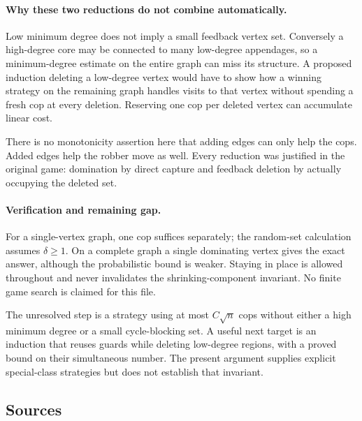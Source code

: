 \documentclass[11pt,a4paper]{article}
\begin{document}
\paragraph{Why these two reductions do not combine automatically.}
Low minimum degree does not imply a small feedback vertex set. Conversely a high-degree core may be connected to many low-degree appendages, so a minimum-degree estimate on the entire graph can miss its structure. A proposed induction deleting a low-degree vertex would have to show how a winning strategy on the remaining graph handles visits to that vertex without spending a fresh cop at every deletion. Reserving one cop per deleted vertex can accumulate linear cost.

There is no monotonicity assertion here that adding edges can only help the cops. Added edges help the robber move as well. Every reduction was justified in the original game: domination by direct capture and feedback deletion by actually occupying the deleted set.

\paragraph{Verification and remaining gap.}
For a single-vertex graph, one cop suffices separately; the random-set calculation assumes $\delta\ge1$. On a complete graph a single dominating vertex gives the exact answer, although the probabilistic bound is weaker. Staying in place is allowed throughout and never invalidates the shrinking-component invariant. No finite game search is claimed for this file.

The unresolved step is a strategy using at most $C\sqrt n$ cops without either a high minimum degree or a small cycle-blocking set. A useful next target is an induction that reuses guards while deleting low-degree regions, with a proved bound on their simultaneous number. The present argument supplies explicit special-class strategies but does not establish that invariant.

\subsection{Sources}
\end{document}
